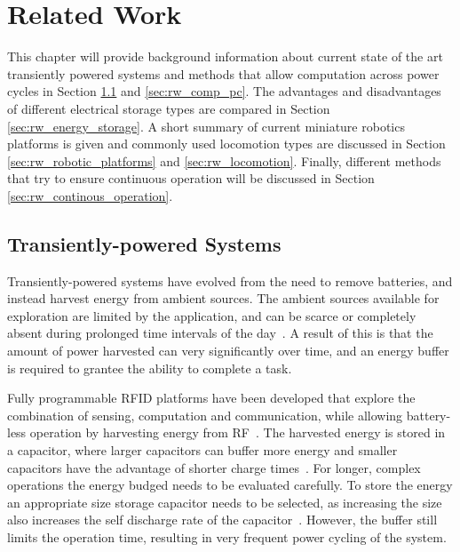 \chapter{Related Work}
\label{chp:related_work}

This chapter will provide background information about current state of the art transiently powered systems and methods that allow computation across power cycles in Section \ref{sec:rw_tp_systems} and \ref{sec:rw_comp_pc}. 
The advantages and disadvantages of different electrical storage types are compared in Section \ref{sec:rw_energy_storage}. 
A short summary of current miniature robotics platforms is given and commonly used locomotion types are discussed in Section \ref{sec:rw_robotic_platforms} and \ref{sec:rw_locomotion}. 
Finally, different methods that try to ensure continuous operation will be discussed in Section \ref{sec:rw_continous_operation}.

\section{Transiently-powered Systems}
\label{sec:rw_tp_systems}

Transiently-powered systems have evolved from the need to remove batteries, and instead harvest energy from ambient sources.
The ambient sources available for exploration are limited by the application, and can be scarce or completely absent during prolonged time intervals of the day~\cite{konstantopoulos_im_2016}.
A result of this is that the amount of power harvested can very significantly over time, and an energy buffer is required to grantee the ability to complete a task.

Fully programmable RFID platforms have been developed that explore the combination of sensing, computation and communication, while allowing battery-less operation by harvesting energy from RF~\cite{sample_transim_2008}. 
The harvested energy is stored in a capacitor, where larger capacitors can buffer more energy and smaller capacitors have the advantage of shorter charge times~\cite{gummerson_mobisys_2010}.
For longer, complex operations the energy budged needs to be evaluated carefully.
To store the energy an appropriate size storage capacitor needs to be selected, as increasing the size also increases the self discharge rate of the capacitor~\cite{naderiparizi_rfid_2015}.
However, the buffer still limits the operation time, resulting in very frequent power cycling of the system.

